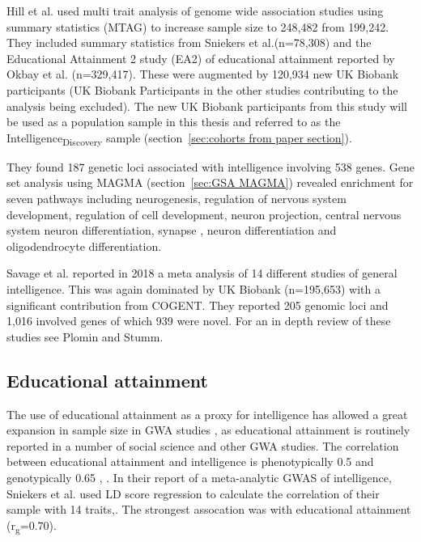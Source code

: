 Hill et al. \cite{hill2019combined} used multi trait analysis of genome wide association studies using summary statistics (MTAG)\cite{turley2018multi} to increase sample size to 248,482 from 199,242. They included summary statistics from Sniekers et al.(n=78,308)\cite{sniekers2017genome} and the Educational Attainment 2 study (EA2) of educational attainment reported by Okbay et al. (n=329,417)\cite{okbay2016genome}. These were augmented by 120,934 new UK Biobank participants (UK Biobank Participants in the other studies contributing to the analysis being excluded). The new UK Biobank participants from this study will be used as a population sample in this thesis and referred to as the Intelligence\textsubscript{Discovery} sample (section~\ref{sec:cohorts from paper section}). 

They found 187 genetic loci associated with intelligence involving 538 genes. Gene set analysis using MAGMA (section~\ref{sec:GSA MAGMA}) revealed enrichment for seven pathways including  neurogenesis, regulation of nervous system development, regulation of cell development, neuron projection, central nervous system neuron differentiation, synapse , neuron differentiation and oligodendrocyte differentiation. 

Savage et al. \cite{savage2018genome} reported in 2018 a meta analysis of 14 different studies of general intelligence. This was again dominated by UK Biobank (n=195,653) with a significant contribution from COGENT. They reported 205 genomic loci and 1,016 involved genes of which 939 were novel. For an in depth review of these studies see Plomin and Stumm\cite{plomin2018new}.

\subsection{Educational attainment}
\label{sec:Intro Educational Attainment}

The use of educational attainment as a proxy for intelligence has allowed a great expansion in sample size in GWA studies \cite{plomin2018new}, as educational attainment is routinely reported in a number of social science and other GWA studies. The correlation between educational attainment and intelligence is phenotypically 0.5 and genotypically 0.65 \cite{plomin2018new}, \cite{rietveld2014common}. In their report of a meta-analytic GWAS of intelligence, Sniekers et al. used LD score regression to calculate the correlation of their sample with 14 traits\cite{sniekers2017genome},\cite{bulik2015ld}. The strongest assocation was with educational attainment (r\textsubscript{g}=0.70).

